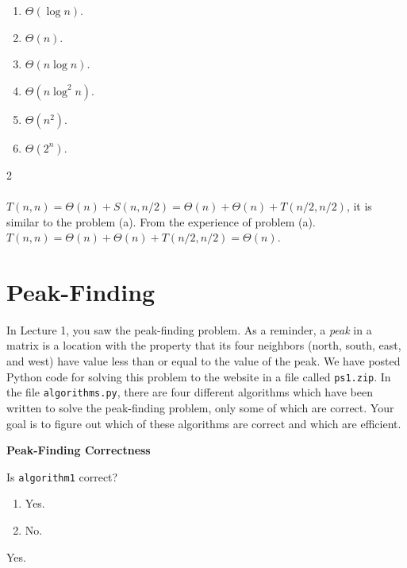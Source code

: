 \documentclass[12pt,twoside]{article}
\begin{document}
\begin{problems}
\begin{problemparts}
\begin{enumerate}
\item $\Theta(\log n)$.
\item $\Theta(n)$.
\item $\Theta(n \log n)$.
\item $\Theta(n \log^2 n)$.
\item $\Theta(n^2)$.
\item $\Theta(2^n)$.
\end{enumerate}

\ifsolution \solution{}
{\color{blue}2
\\
\\
$T(n,n)= \Theta(n)+S(n,n/2)=\Theta(n)+\Theta(n)+T(n/2,n/2)$, it is similar to the problem (a). From the experience of problem (a). $T(n,n) = \Theta(n)+\Theta(n)+T(n/2,n/2) = \Theta(n)$.
\\}
\fi

\end{problemparts}

\section*{Peak-Finding}

In Lecture 1,
you saw the peak-finding problem.
As a reminder,
a \emph{peak} in a matrix
is a location with the property that its four neighbors
(north, south, east, and west)
have value less than or equal to the value of the peak.
We have posted Python code for solving this problem
to the website in a file called \texttt{ps1.zip}.
In the file \texttt{algorithms.py},
there are four different algorithms
which have been written
to solve the peak-finding problem,
only some of which are correct.
Your goal is to figure out
which of these algorithms are correct
and which are efficient.

\problem {} \textbf{Peak-Finding Correctness}

\begin{problemparts}

\problempart {} Is \texttt{algorithm1} correct?
\begin{enumerate}
\item Yes.
\item No.
\end{enumerate}

\ifsolution \solution{}
{\color{blue}Yes.}
\fi


\end{problemparts}
\end{problems}
\end{document}
